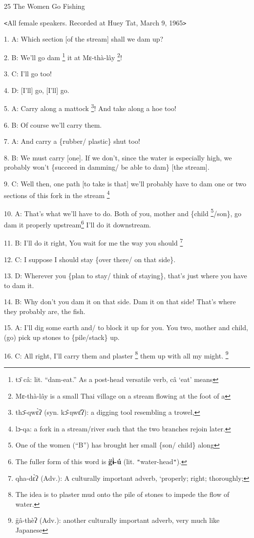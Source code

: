 
25 The Women Go Fishing

\texttt{<}All female speakers. Recorded at Huey Tat, March 9, 1965\texttt{>}

1. A: Which section [of the stream] shall we dam up?

2. B: We'll go dam \footnote{tɔ̄ câ: lit. ``dam-eat.'' As a post-head versatile verb, câ `eat' means} it at Mɛ-thà-lây \footnote{Mɛ-thà-lây is a small Thai village on a stream flowing at the foot of a}!

3. C: I'll go too!

4. D: [I'll] go, [I'll] go.

5. A: Carry along a mattock \footnote{thɔ̄-qwɛ̀ʔ (syn. kɔ̂-ŋwɛ̂ʔ): a digging tool resembling a trowel,}! And take along a hoe too!

6. B: Of course we'll carry them.

7. A: And carry a \{rubber/ plastic\} shut too!

8. B: We must carry [one]. If we don't, since the water is especially high, we
probably won't \{succeed in damming/ be able to dam\} [the stream].

9. C: Well then, one path [to take is that] we'll probably have to dam one or two
sections of this fork in the stream \.\footnote{lɔ-qa: a fork in a stream/river such that the two branches rejoin later.}

10. A: That's what we'll have to do. Both of you, mother and \{child \footnote{One of the women (``B'') has brought her small \{son/ child\} along}/son\},
go dam it properly upstream\.\footnote{The fuller form of this word is \textbf{g̈ɨ̀-ú} (lit. \texttt{"}water-head\texttt{"}).} I'll do it downstream.

11. B: I'll do it right, You wait for me the way you should \.\footnote{qha-dɛ̀ʔ (Adv.): A culturally important adverb, `properly; right; thoroughly;}

12. C: I suppose I should stay \{over there/ on that side\}.

13. D: Wherever you \{plan to stay/ think of staying\}, that's just where you have
to dam it.

14. B: Why don't you dam it on that side. Dam it on that side! That's where they
probably are, the fish.

15. A: I'll dig some earth and/ to block it up for you.  You two, mother and child,
(go) pick up stones to \{pile/stack\} up.

16. C: All right, I'll carry them and plaster \footnote{The idea is to plaster mud onto the pile of stones to impede the flow of water.} them up with all my might. \footnote{g̈â-thèʔ (Adv.): another culturally important adverb, very much like Japanese}

